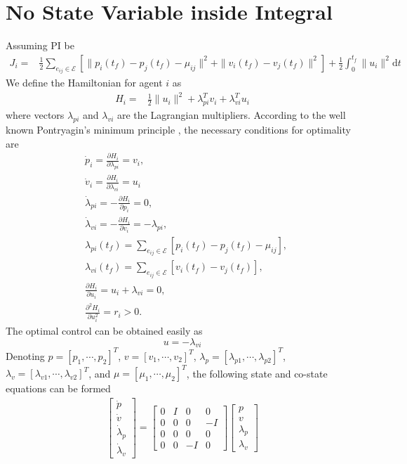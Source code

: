 \documentclass[letterpaper, 10 pt, conference,onecolumn]{ieeeconf}  %
\begin{document}
\section{No State Variable inside Integral}


Assuming PI be
\begin{align}
J_i=&\frac{1}{2}\sum_{e_{ij}\in\mathcal{E}}[\|p_i(t_f)-p_j(t_f)-\mu_{ij}\|^2+ \|v_i(t_f)-v_j(t_f)\|^2]+\frac{1}{2}\int^{t_f}_0 \|u_i\|^2 \mbox{d}t
\end{align}
We define the Hamiltonian for agent $i$ as
\begin{align}
H_i=&\frac{1}{2}\|u_i\|^2+ \lambda_{pi}^Tv_i+
\lambda_{vi}^Tu_i
\end{align}
where vectors $\lambda_{pi}$ and $\lambda_{vi}$ are the Lagrangian multipliers. According to the well known Pontryagin's minimum principle \cite{pontreiiagin1962mathematical}, the necessary conditions for optimality are
\begin{subequations}\begin{align}
&\dot{p}_{i}=\frac{\partial H_i}{\partial \lambda_{pi}}=v_i,\label{NecPi}\\ &\dot{v}_{i}=\frac{\partial H_i}{\partial \lambda_{vi}}=u_i\label{NecPi1}\\
&\dot{\lambda}_{pi}=-\frac{\partial H_i}{\partial p_{i}}= 0,\\
&\dot{\lambda}_{vi}=-\frac{\partial H_i}{\partial v_{i}}= -\lambda_{pi},\label{NecPi2}\\
&\lambda_{pi}(t_f)= \sum_{e_{ij}\in\mathcal{E}}[p_{i}(t_f)-p_{j}(t_f)-\mu_{ij}],\label{NecPi3}\\
&\lambda_{vi}(t_f)= \sum_{e_{ij}\in\mathcal{E}}[v_{i}(t_f)-v_{j}(t_f)],\label{NecPi4}\\
&\frac{\partial H_i}{\partial u_i}=u_i+\lambda_{vi} =0,\\ &\frac{\partial^2 H_i}{\partial u_i^2}=r_i>0.\label{NecPi5}
\end{align}
\end{subequations}
The optimal control can be obtained easily as
\[u=-\lambda_{vi}\]
Denoting $p=[p_1,\cdots,p_2]^T$, $v=[v_1,\cdots,v_2]^T$, $\lambda_p=[\lambda_{p1},\cdots,\lambda_{p2}]^T$,  $\lambda_v=[\lambda_{v1},\cdots,\lambda_{v2}]^T$, and $\mu=[\mu_1,\cdots,\mu_2]^T$, the following state and co-state equations can be formed
\begin{align*}
\begin{bmatrix}
\dot{p}\\
\dot{v}\\
\dot{\lambda}_{p}\\
\dot{\lambda}_{v}
\end{bmatrix}=\begin{bmatrix}
0&I&0&0\\
0&0&0&-I\\
0&0&0&0\\
0&0&-I&0
\end{bmatrix}\begin{bmatrix}
p\\
v\\
\lambda_{p}\\
\lambda_{v}
\end{bmatrix}
\end{align*}
\end{document}
